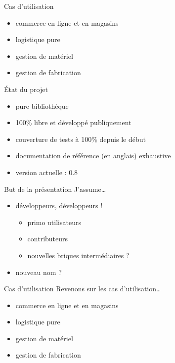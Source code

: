 \documentclass{beamer}
\begin{document}
\begin{frame}{Cas d'utilisation}
  \begin{itemize}
    \item commerce en ligne et en magasins
    \item logistique pure
    \item gestion de matériel
    \item gestion de fabrication
  \end{itemize}
\end{frame}

\begin{frame}{État du projet}
  \begin{itemize}
  \item pure bibliothèque
  \item 100\% libre et développé publiquement
  \item couverture de tests à 100\% depuis le début
  \item documentation de référence (en anglais) exhaustive
  \item version actuelle : 0.8
  \end{itemize}
\end{frame}

\begin{frame}{But de la présentation}
  J'assume…
  \begin{itemize}
    \item<2-> développeurs, développeurs !
      \begin{itemize}
        \item<3-> primo utilisateurs
        \item<4-> contributeurs
        \item<5-> nouvelles briques intermédiaires ?
      \end{itemize}
    \item<6-> nouveau nom ?
  \end{itemize}
\end{frame}

\begin{frame}{Cas d'utilisation}
  Revenons sur les cas d'utilisation…
  \begin{itemize}
    \item commerce en ligne et en magasins
    \item logistique pure
    \item gestion de matériel
    \item gestion de fabrication
  \end{itemize}
\end{frame}
\end{document}
